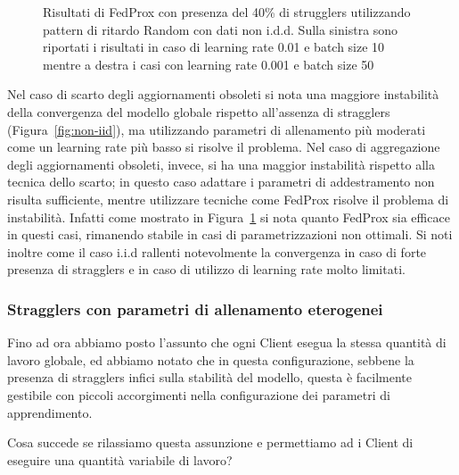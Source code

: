 \documentclass[a4paper, oneside, openright]{report}
\begin{document}
\begin{figure}[h!]
    \centering
    \subfloat{{\texttt{[image: assets/strag=.4\_bs=10\_lr=0.01\_mu=1.png]} }}
    \subfloat{{\texttt{[image: assets/strag=.4\_bs=50\_lr=0.001\_mu=1.png]} }}

  \caption{Risultati di FedProx con presenza del 40\% di strugglers utilizzando pattern di ritardo Random con dati non i.d.d. Sulla sinistra sono riportati i risultati in caso di learning rate 0.01 e batch size 10 mentre a destra i casi con learning rate 0.001 e batch size 50}
    \label{fig:non-iid-fedprox}
\end{figure}

Nel caso di scarto degli aggiornamenti obsoleti si nota una maggiore instabilità della convergenza del modello globale rispetto all'assenza di stragglers (Figura~\ref{fig:non-iid}), ma utilizzando parametri di allenamento più moderati come un learning rate più basso si risolve il problema. Nel caso  di aggregazione degli aggiornamenti obsoleti, invece, si ha una maggior instabilità rispetto alla tecnica dello scarto; in questo caso adattare i parametri di addestramento non risulta sufficiente, mentre utilizzare tecniche come FedProx risolve il problema di instabilità. Infatti come mostrato in Figura~\ref{fig:non-iid-fedprox} si nota quanto FedProx sia efficace in questi casi, rimanendo stabile in casi di parametrizzazioni non ottimali. Si noti inoltre come il caso i.i.d rallenti notevolmente la convergenza in caso di forte presenza di stragglers e in caso di utilizzo di learning rate molto limitati.

\subsubsection*{Stragglers con parametri di allenamento eterogenei}
Fino ad ora abbiamo posto l'assunto che ogni Client esegua la stessa quantità di lavoro globale, ed abbiamo notato che in questa configurazione, sebbene la presenza di stragglers infici sulla stabilità del modello, questa è facilmente gestibile con piccoli accorgimenti nella configurazione dei parametri di apprendimento. 

Cosa succede se rilassiamo questa assunzione e permettiamo ad i Client di eseguire una quantità variabile di lavoro? 
\end{document}
